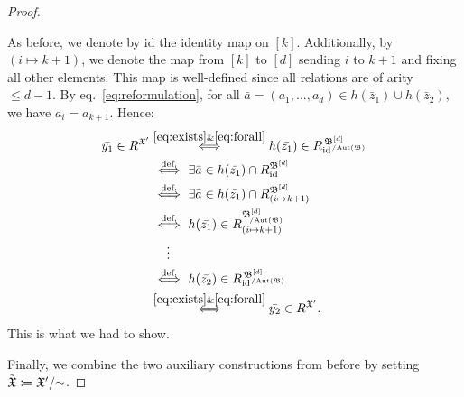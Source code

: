 \begin{proof}
\begin{claimproof}
        As before, we denote by $\mathrm{id}$ the identity map on $[k]$.
        Additionally, by $(i\mapsto k+1)$, we denote the map from $[k]$ to $[d]$ sending $i$ to $k+1$ and fixing all other elements.
        This map is well-defined since all relations are of arity $\leq d-1$.
        By eq.~\eqref{eq:reformulation}, for all $\bar{a}=(a_1,\dots, a_d)\in h(\bar{z}_1)\cup h(\bar{z}_2)$, we have  $a_i=a_{k+1}$. 
        Hence:
        \begin{align*}
           \bar{y_1} \in  R^{\struct{X}'} &  \overset{\eqref{eq:exists}\&\eqref{eq:forall}}{\Longleftrightarrow}  h(\bar{z_1}) \in 
              R_{\mathrm{id}}^{\, \smash{\fpwr{\struct{B}}{d}_{\orbeq{\Aut(\struct{B})}}}} \\
            & \ \overset{\text{def.}}{\Longleftrightarrow} \ \exists \bar{a} \in h(\bar{z_1}) \cap R_{\mathrm{id}}^{\fpwr{\struct{B}}{d}}  \\
            & \ \overset{\text{def.}}{\Longleftrightarrow} \ \exists \bar{a}\in h(\bar{z_1}) \cap R_{(i\mapsto k+1)}^{\fpwr{\struct{B}}{d}} \\
            & \ \overset{\text{def.}}{\Longleftrightarrow} \ h(\bar{z_1}) \in R_{(i\mapsto k+1)}^{\fpwr{\struct{B}}{d}_{\orbeq{\Aut(\struct{B})}}}  
            \\
            & \quad \    \vdots  
            \\
            &  \ \overset{\text{def.}}{\Longleftrightarrow} \ h(\bar{z_2}) \in R_{\mathrm{id}}^{\, \smash{\fpwr{\struct{B}}{d}_{\orbeq{\Aut(\struct{B})}}}} \\
            & \overset{\eqref{eq:exists}\&\eqref{eq:forall}}{\Longleftrightarrow} \bar{y_2}\in  R^{\struct{X}'}.   
        \end{align*}
        This is what we had to show.
        \end{claimproof}  

     Finally, we combine the two auxiliary constructions from before by setting $\Tilde{\mathfrak{X}} \mathrel{\mathop:}\mathrel{\mkern-1.2mu}= \mathfrak{X}' /{\sim}$.
  

\end{proof}
